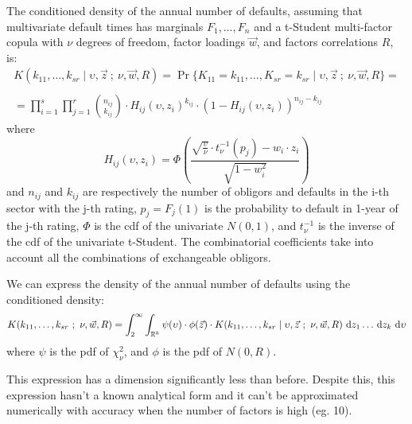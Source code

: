 \documentclass[11pt,fleqn]{book} %
\begin{document}
\begin{proposition}
	\label{prop:cdand}
	The conditioned density of the annual number of defaults, assuming 
	that multivariate default times has marginals $F_1,\dots,F_n$ and a 
	t-Student multi-factor copula with $\nu$ degrees of freedom, factor 
	loadings $\vec{w}$, and factors correlations $R$, is:
	\begin{displaymath}
		\begin{array}{l}
			K(k_{11},\dots,k_{sr} \mid \upsilon,\vec{z}\ ;\ \nu,\vec{w}, R) = 
			\Pr\{K_{11}=k_{11},\dots,K_{sr}=k_{sr} \mid \upsilon,\vec{z}\ ;\ \nu, \vec{w}, R\} = \\
			\\
			= \displaystyle \prod_{i=1}^s \prod_{j=1}^r \binom{n_{ij}}{k_{ij}} \cdot
			H_{ij}(\upsilon,z_i)^{k_{ij}} \cdot
			\left( 1 - H_{ij}(\upsilon,z_i) \right)^{n_{ij}-k_{ij}}
		\end{array}
	\end{displaymath}
	where
	\begin{displaymath}
		H_{ij}(\upsilon,z_i) = \Phi\left(  
		\frac{\sqrt{\frac{\upsilon}{\nu}} \cdot t_{\nu}^{-1}(p_j) - w_i\cdot z_i}{\sqrt{1-w_i^2}}
		\right)
	\end{displaymath}
	and $n_{ij}$ and $k_{ij}$ are respectively the number of obligors and 
	defaults in the i-th sector with the j-th rating, $p_j = F_j(1)$ 
	is the probability to default in 1-year of the j-th rating,
	$\Phi$ is the cdf of the univariate $N(0,1)$, and $t_{\nu}^{-1}$ is the 
	inverse of the cdf of the univariate t-Student. The combinatorial coefficients 
	take into account all the combinations of exchangeable obligors.
\end{proposition}

\begin{corollary}
	We can express the density of the annual number of defaults using 
	the conditioned density:
	\begin{displaymath}
			K(k_{11},\dots,k_{sr}\ ;\ \nu, \vec{w}, R) = 
			\displaystyle \int_2^{\infty} \int_{\mathbb{R}^k}
			\psi(\upsilon) \cdot \phi(\vec{z}) \cdot
			K(k_{11},\dots,k_{sr} \mid \upsilon,\vec{z}\ ;\ \nu,\vec{w}, R) 
			\ud z_1 \dots \ud z_k \ud \upsilon
	\end{displaymath}
	where $\psi$ is the pdf of $\chi_{\nu}^2$, and $\phi$ is the pdf of $N(0,R)$.
\end{corollary}

This expression has a dimension significantly less than before. Despite this, 
this expression hasn't a known analytical form and it can't be approximated 
numerically with accuracy when the number of factors is high (eg. 10).
\end{document}
